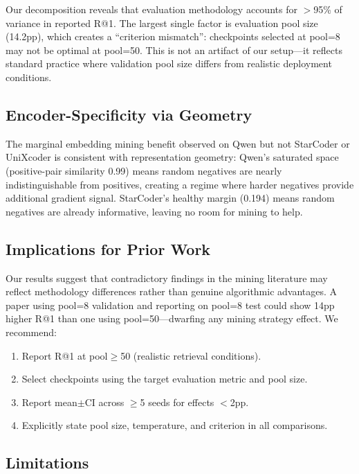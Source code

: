 \documentclass[11pt]{article}
\begin{document}
Our decomposition reveals that evaluation methodology accounts for $>$95\% of variance in reported R@1. The largest single factor is evaluation pool size (14.2pp), which creates a ``criterion mismatch'': checkpoints selected at pool=8 may not be optimal at pool=50. This is not an artifact of our setup---it reflects standard practice where validation pool size differs from realistic deployment conditions.

\subsection{Encoder-Specificity via Geometry}

The marginal embedding mining benefit observed on Qwen but not StarCoder or UniXcoder is consistent with representation geometry: Qwen's saturated space (positive-pair similarity 0.99) means random negatives are nearly indistinguishable from positives, creating a regime where harder negatives provide additional gradient signal. StarCoder's healthy margin (0.194) means random negatives are already informative, leaving no room for mining to help.

\subsection{Implications for Prior Work}

Our results suggest that contradictory findings in the mining literature may reflect methodology differences rather than genuine algorithmic advantages. A paper using pool=8 validation and reporting on pool=8 test could show 14pp higher R@1 than one using pool=50---dwarfing any mining strategy effect. We recommend:

\begin{enumerate}
    \item Report R@1 at pool$\geq$50 (realistic retrieval conditions).
    \item Select checkpoints using the target evaluation metric and pool size.
    \item Report mean$\pm$CI across $\geq$5 seeds for effects $<$2pp.
    \item Explicitly state pool size, temperature, and criterion in all comparisons.
\end{enumerate}

\subsection{Limitations}
\end{document}
